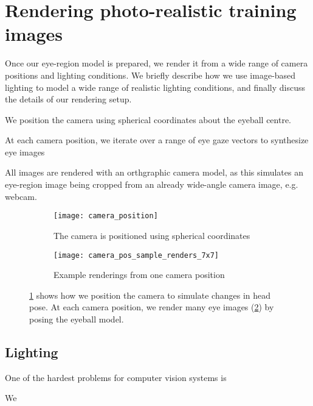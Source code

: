 
\section{Rendering photo-realistic training images}

Once our eye-region model is prepared, we render it from a wide range of camera positions and lighting conditions.
%
We briefly describe how we use image-based lighting \cite{debevec2002image} to model a wide range of realistic lighting conditions, and finally discuss the details of our rendering setup.

We position the camera using spherical coordinates about the eyeball centre. 

At each camera position, we iterate over a range of eye gaze vectors to synthesize eye images 

All images are rendered with an orthgraphic camera model, as this simulates an eye-region image being cropped from an already wide-angle camera image, e.g. webcam.

\begin{figure}
    \centering
    \begin{subfigure}[t]{0.48\columnwidth}
        \texttt{[image: camera\_position]}
        \caption{The camera is positioned using spherical coordinates}
        \label{fig:cam_pos_spher_coords}
    \end{subfigure}
    \hfill
    \begin{subfigure}[t]{0.48\columnwidth}
        \texttt{[image: camera\_pos\_sample\_renders\_7x7]}
        \caption{Example renderings from one camera position}
        \label{fig:cam_pos_example_renders}
    \end{subfigure}
    \caption{\ref{fig:cam_pos_spher_coords} shows how we position the camera to simulate changes in head pose. At each camera position, we render many eye images (\ref{fig:cam_pos_example_renders}) by posing the eyeball model.}
    \label{fig:cam_pos}
\end{figure}

\subsection{Lighting}

One of the hardest problems for computer vision systems is 

We 

